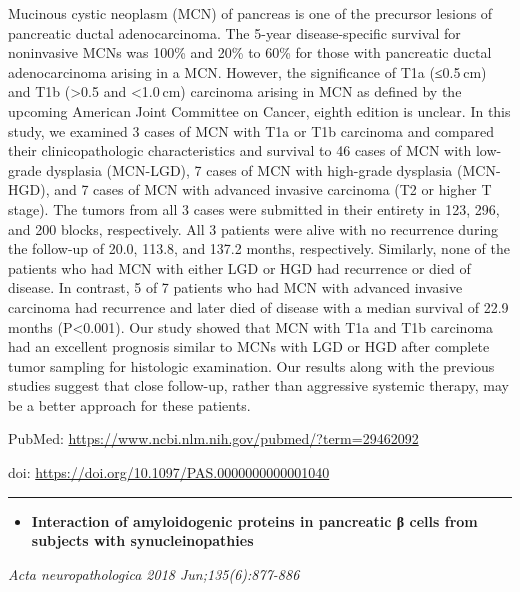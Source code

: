 \documentclass[]{article}
\providecommand{\tightlist}{%
  \setlength{\itemsep}{0pt}\setlength{\parskip}{0pt}}
\begin{document}
Mucinous cystic neoplasm (MCN) of pancreas is one of the precursor
lesions of pancreatic ductal adenocarcinoma. The 5-year disease-specific
survival for noninvasive MCNs was 100\% and 20\% to 60\% for those with
pancreatic ductal adenocarcinoma arising in a MCN. However, the
significance of T1a (≤0.5 cm) and T1b (\textgreater{}0.5 and
\textless{}1.0 cm) carcinoma arising in MCN as defined by the upcoming
American Joint Committee on Cancer, eighth edition is unclear. In this
study, we examined 3 cases of MCN with T1a or T1b carcinoma and compared
their clinicopathologic characteristics and survival to 46 cases of MCN
with low-grade dysplasia (MCN-LGD), 7 cases of MCN with high-grade
dysplasia (MCN-HGD), and 7 cases of MCN with advanced invasive carcinoma
(T2 or higher T stage). The tumors from all 3 cases were submitted in
their entirety in 123, 296, and 200 blocks, respectively. All 3 patients
were alive with no recurrence during the follow-up of 20.0, 113.8, and
137.2 months, respectively. Similarly, none of the patients who had MCN
with either LGD or HGD had recurrence or died of disease. In contrast, 5
of 7 patients who had MCN with advanced invasive carcinoma had
recurrence and later died of disease with a median survival of 22.9
months (P\textless{}0.001). Our study showed that MCN with T1a and T1b
carcinoma had an excellent prognosis similar to MCNs with LGD or HGD
after complete tumor sampling for histologic examination. Our results
along with the previous studies suggest that close follow-up, rather
than aggressive systemic therapy, may be a better approach for these
patients.

PubMed: \url{https://www.ncbi.nlm.nih.gov/pubmed/?term=29462092}

doi: \url{https://doi.org/10.1097/PAS.0000000000001040}

{}

{}

\begin{center}\rule{0.5\linewidth}{\linethickness}\end{center}

\begin{itemize}
\tightlist
\item
  \textbf{Interaction of amyloidogenic proteins in pancreatic β cells
  from subjects with synucleinopathies}
\end{itemize}

\emph{Acta neuropathologica 2018 Jun;135(6):877-886}
\end{document}
